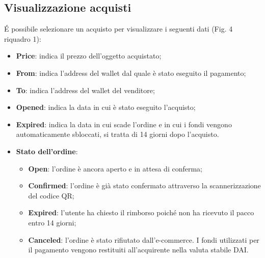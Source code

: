 \documentclass[a4paper, 12pt]{article}
\begin{document}
\subsection{Visualizzazione acquisti}
É possibile selezionare un acquisto per visualizzare i seguenti dati (Fig. 4 riquadro 1):
\begin{itemize}
\item \textbf{Price}: indica il prezzo dell'oggetto acquistato;
\item \textbf{From}: indica l'address del wallet dal quale è stato eseguito il pagamento;
\item \textbf{To}: indica l'address del wallet del venditore;
\item \textbf{Opened}: indica la data in cui è stato eseguito l'acquisto;
\item \textbf{Expired}: indica la data in cui scade l'ordine e in cui i fondi vengono automaticamente sbloccati, si tratta di 14 giorni dopo l'acquisto.
\item \textbf{Stato dell'ordine}:
  \begin{itemize}
    \item \textbf{Open}: l'ordine è ancora aperto e in attesa di conferma;
    \item \textbf{Confirmed}: l'ordine è già stato confermato attraverso la scannerizzazione del codice QR;
    \item \textbf{Expired}: l'utente ha chiesto il rimborso poiché non ha ricevuto il pacco entro 14 giorni;
    \item \textbf{Canceled}: l'ordine è stato rifiutato dall'e-commerce. I fondi utilizzati per il pagamento vengono restituiti all'acquirente nella valuta stabile DAI.
  \end{itemize}
\end{itemize}
\end{document}

